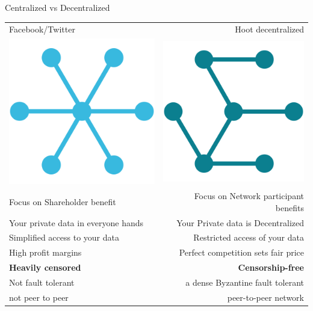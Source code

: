 \documentclass[10pt]{beamer}
\begin{document}
\begin{frame}[t]{Centralized vs Decentralized 
}
  \begin{table}
    \begin{tabular}{@{} lr @{}}
      \toprule
      Facebook/Twitter & Hoot decentralized\\
      \includegraphics[scale=0.25]{static/cent} & \includegraphics[scale=0.25]{static/dec}\\
      \midrule
  	 Focus on Shareholder benefit  &  Focus on Network participant benefits\\
       Your private data in everyone hands &  Your Private data is Decentralized\\
      Simplified access to your data  &  Restricted access of your data \\
  	 High profit margins  &  Perfect competition sets fair price\\
 \textbf{Heavily censored}  & 	\textbf{Censorship-free}\\
	 Not fault tolerant  & 	a dense Byzantine fault tolerant  \\
 not peer to peer & peer-to-peer network\\
      \bottomrule
    \end{tabular}
  \end{table}    
\end{frame}
\end{document}
